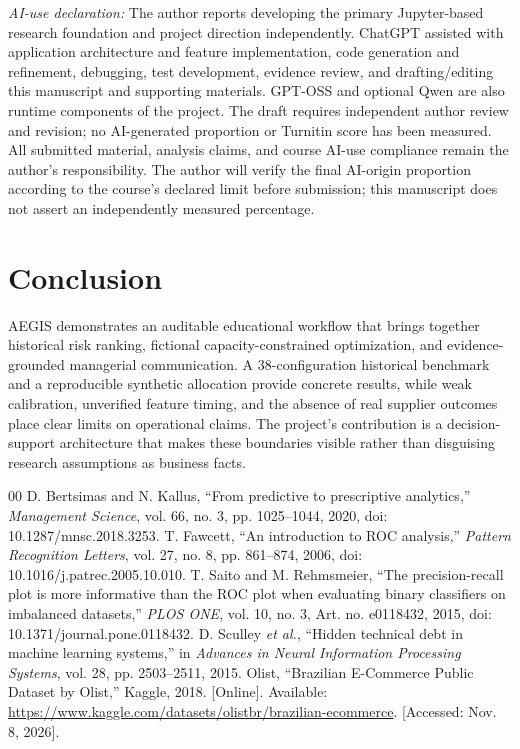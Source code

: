 \documentclass[conference,a4paper]{IEEEtran}
\begin{document}
\textit{AI-use declaration:} The author reports developing the primary Jupyter-based research foundation and project direction independently. ChatGPT assisted with application architecture and feature implementation, code generation and refinement, debugging, test development, evidence review, and drafting/editing this manuscript and supporting materials. GPT-OSS and optional Qwen are also runtime components of the project. The draft requires independent author review and revision; no AI-generated proportion or Turnitin score has been measured. All submitted material, analysis claims, and course AI-use compliance remain the author's responsibility. The author will verify the final AI-origin proportion according to the course's declared limit before submission; this manuscript does not assert an independently measured percentage.

\balance
\section{Conclusion}
AEGIS demonstrates an auditable educational workflow that brings together historical risk ranking, fictional capacity-constrained optimization, and evidence-grounded managerial communication. A 38-configuration historical benchmark and a reproducible synthetic allocation provide concrete results, while weak calibration, unverified feature timing, and the absence of real supplier outcomes place clear limits on operational claims. The project's contribution is a decision-support architecture that makes these boundaries visible rather than disguising research assumptions as business facts.

\begin{thebibliography}{00}
 D. Bertsimas and N. Kallus, ``From predictive to prescriptive analytics,'' \emph{Management Science}, vol. 66, no. 3, pp. 1025--1044, 2020, doi: 10.1287/mnsc.2018.3253.
 T. Fawcett, ``An introduction to ROC analysis,'' \emph{Pattern Recognition Letters}, vol. 27, no. 8, pp. 861--874, 2006, doi: 10.1016/j.patrec.2005.10.010.
 T. Saito and M. Rehmsmeier, ``The precision-recall plot is more informative than the ROC plot when evaluating binary classifiers on imbalanced datasets,'' \emph{PLOS ONE}, vol. 10, no. 3, Art. no. e0118432, 2015, doi: 10.1371/journal.pone.0118432.
 D. Sculley \emph{et al.}, ``Hidden technical debt in machine learning systems,'' in \emph{Advances in Neural Information Processing Systems}, vol. 28, pp. 2503--2511, 2015.
 Olist, ``Brazilian E-Commerce Public Dataset by Olist,'' Kaggle, 2018. [Online]. Available: \url{https://www.kaggle.com/datasets/olistbr/brazilian-ecommerce}. [Accessed: Nov. 8, 2026].
\end{thebibliography}
\end{document}
